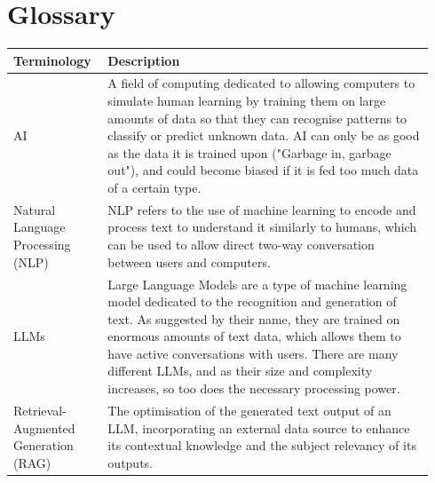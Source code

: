 \documentclass[12pt]{report}
\begin{document}
\chapter*{Glossary}
\thispagestyle{empty}
\begin{table}[H]
    \begin{tabular}{|p{0.2\linewidth}|p{0.74\linewidth}|}
        \hline
        \cellcolor{blue!25}Terminology & \cellcolor{blue!25}Description\\
        \hline 

        AI & A field of computing dedicated to allowing computers to simulate human
        learning by training them on large amounts of data so that they can recognise patterns to classify or 
        predict unknown data. AI can only be as good as the data it is trained upon ("Garbage in, garbage out"), and could
        become biased if it is fed too much data of a certain type.\\



        \hline

        Natural Language Processing \newline (NLP) & NLP refers to the use of machine learning to encode and 
        process text to understand it similarly to humans, which can be used to allow direct 
        two-way conversation between users and computers.\\

        \hline
        
        LLMs & Large Language Models are a type of machine learning model dedicated to the recognition and generation of text.
        As suggested by their name, they are trained on enormous amounts of text data, which allows them 
        to have active conversations with users. There are many different LLMs, and as their size and 
        complexity increases, so too does the necessary processing power. 
        \\
        \hline 

        Retrieval-Augmented Generation \newline (RAG) & The optimisation of the generated text output of an LLM, incorporating
        an external data source to enhance its contextual knowledge and the subject relevancy of its outputs. \\


\end{tabular}
\end{table}
\end{document}
